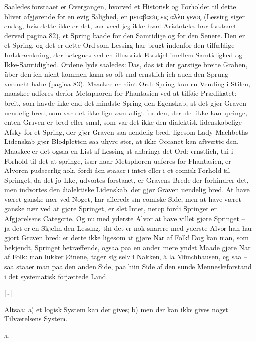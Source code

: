 \documentclass[12pt,a4paper]{article}
\begin{document}
Saaledes forstaaet er Overgangen, hvorved et Historisk og Forholdet til dette bliver afgjørende for en evig Salighed, en μεταβασις εις αλλο γενος (Lessing siger endog, hvis dette ikke er det, saa veed jeg ikke hvad Aristoteles har forstaaet derved pagina 82), et Spring baade for den Samtidige og for den Senere. Den er et Spring, og det er dette Ord som Lessing har brugt indenfor den tilfældige Indskrænkning, der betegnes ved en illusorisk Forskjel imellem Samtidighed og Ikke-Samtidighed. Ordene lyde saaledes: Das, das ist der garstige breite Graben, über den ich nicht kommen kann so oft und ernstlich ich auch den Sprung versucht habe (pagina 83). Maaskee er hiint Ord: Spring kun en Vending i Stilen, maaskee udføres derfor Metaphoren for Phantasien ved at tilføie Prædikatet: breit, som havde ikke end det mindste Spring den Egenskab, at det gjør Graven uendelig bred, som var det ikke lige vanskeligt for den, der slet ikke kan springe, enten Graven er bred eller smal, som var det ikke den dialektisk lidenskabelige Afsky for et Spring, der gjør Graven saa uendelig bred, ligesom Lady Machbeths Lidenskab gjør Blodpletten saa uhyre stor, at ikke Oceanet kan aftvætte den. Maaskee er det ogsaa en List af Lessing at anbringe det Ord: ernstlich, thi i Forhold til det at springe, især naar Metaphoren udføres for Phantasien, er Alvoren pudseerlig nok, fordi den staaer i intet eller i et comisk Forhold til Springet, da det jo ikke, udvortes forstaaet, er Gravens Brede der forhindrer det, men indvortes den dialektiske Lidenskab, der gjør Graven uendelig bred. At have været ganske nær ved Noget, har allerede sin comiske Side, men at have været ganske nær ved at gjøre Springet, er slet Intet, netop fordi Springet er Afgjørelsens Categorie. Og nu med yderste Alvor at have villet gjøre Springet – ja det er en Skjelm den Lessing, thi det er nok snarere med yderste Alvor han har gjort Graven bred: er dette ikke ligesom at gjøre Nar af Folk! Dog kan man, som bekjendt, Springet betræffende, ogsaa paa en anden mere yndet Maade gjøre Nar af Folk: man lukker Øinene, tager sig selv i Nakken, à la Münchhausen, og saa – saa staaer man paa den anden Side, paa hiin Side af den sunde Menneskeforstand i det systematisk forjættede Land.

[…]

Altsaa: a) et logisk System kan der gives; b) men der kan ikke gives noget Tilværelsens System.

a.
\end{document}
